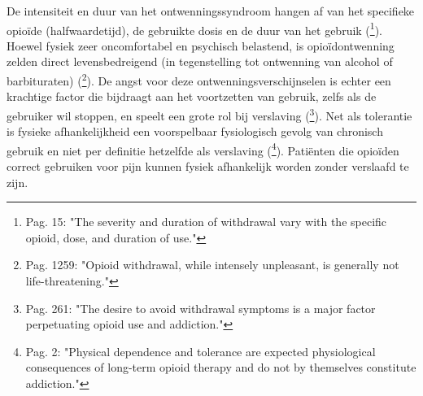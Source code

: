 \documentclass[11pt, a4paper]{report} %
\begin{document}
De intensiteit en duur van het ontwenningssyndroom hangen af van het specifieke opioïde (halfwaardetijd), de gebruikte dosis en de duur van het gebruik (\cite{Kosten2002NeurobiologyDependence}\footnote{Pag. 15: "The severity and duration of withdrawal vary with the specific opioid, dose, and duration of use."}). Hoewel fysiek zeer oncomfortabel en psychisch belastend, is opioïdontwenning zelden direct levensbedreigend (in tegenstelling tot ontwenning van alcohol of barbituraten) (\cite{Volkow2016OpioidAbuseChronicPain}\footnote{Pag. 1259: "Opioid withdrawal, while intensely unpleasant, is generally not life-threatening."}). De angst voor deze ontwenningsverschijnselen is echter een krachtige factor die bijdraagt aan het voortzetten van gebruik, zelfs als de gebruiker wil stoppen, en speelt een grote rol bij verslaving (\cite{Cicero2017Review}\footnote{Pag. 261: "The desire to avoid withdrawal symptoms is a major factor perpetuating opioid use and addiction."}). Net als tolerantie is fysieke afhankelijkheid een voorspelbaar fysiologisch gevolg van chronisch gebruik en niet per definitie hetzelfde als verslaving (\cite{Hooten2021OpioidsChronicPain}\footnote{Pag. 2: "Physical dependence and tolerance are expected physiological consequences of long-term opioid therapy and do not by themselves constitute addiction."}). Patiënten die opioïden correct gebruiken voor pijn kunnen fysiek afhankelijk worden zonder verslaafd te zijn.
\end{document}
